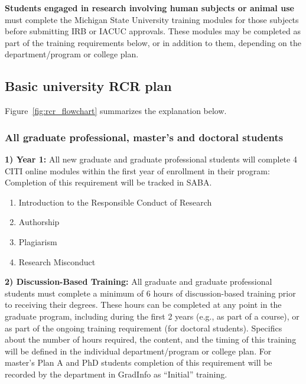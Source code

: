 \vspace{2mm}
\noindent
\textbf{Students engaged in research involving human subjects or animal use}
must complete the Michigan State University training modules for those
subjects before submitting IRB or IACUC approvals. These modules may
be completed as part of the training requirements below, or in
addition to them, depending on the department/program or college plan.

\vspace{2mm}
\subsection{Basic university RCR plan}
\label{sec:rcr_basic_plan}

Figure~\ref{fig:rcr_flowchart} summarizes the explanation below.

\vspace{2mm}
\subsubsection{All graduate professional, master’s and doctoral students}

\vspace{2mm}
\noindent
\textbf{1)  Year 1:} All new graduate and graduate professional students
will complete 4 CITI online modules within the first year of
enrollment in their program: Completion of this requirement will be
tracked in SABA.

\begin{enumerate}
\item Introduction to the Responsible Conduct of Research
\vspace{-2mm}
\item Authorship
\vspace{-2mm}
\item Plagiarism
\vspace{-2mm}
\item Research Misconduct
\end{enumerate}

\vspace{2mm}
\noindent
\textbf{2)  Discussion-Based Training:} All graduate and graduate professional students must complete a
minimum of 6 hours of discussion-based training prior to receiving
their degrees. These hours can be completed at any point in the
graduate program, including during the first 2 years (e.g., as part of
a course), or as part of the ongoing training requirement (for
doctoral students). Specifics about the number of hours required, the
content, and the timing of this training will be defined in the
individual department/program or college plan. For master’s Plan A and
PhD students completion of this requirement will be recorded by the
department in GradInfo as “Initial” training.


